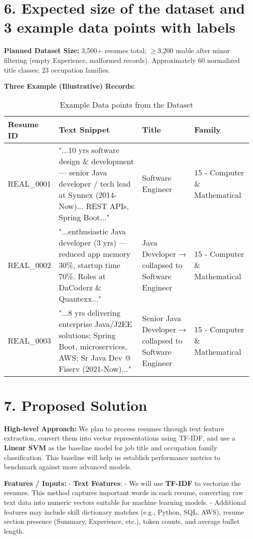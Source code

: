 \documentclass[12pt]{article}
\begin{document}
\section*{6. Expected size of the dataset and 3 example data points with labels}

\noindent \textbf{Planned Dataset Size:}  
3,500+ resumes total; $\geq$3,200 usable after minor filtering (empty Experience, malformed records). Approximately 60 normalized title classes; 23 occupation families.

\medskip
\noindent \textbf{Three Example (Illustrative) Records:}

\begin{table}[ht]
\centering
\begin{tabular}{|p{2.5cm}|p{5.5cm}|p{3.5cm}|p{3.5cm}|}
\hline
\textbf{Resume ID} & \textbf{Text Snippet} & \textbf{Title} & \textbf{Family} \\
\hline
REAL\_0001 & "...10 yrs software design \& development — senior Java developer / tech lead at Synnex (2014-Now)... REST APIs, Spring Boot..." & Software Engineer & 15 - Computer \& Mathematical \\
REAL\_0002 & "...enthusiastic Java developer (3 yrs) — reduced app memory 30\%, startup time 70\%. Roles at DaCoderz \& Quantexx..." & Java Developer → collapsed to Software Engineer & 15 - Computer \& Mathematical \\
REAL\_0003 & "...8 yrs delivering enterprise Java/J2EE solutions; Spring Boot, microservices, AWS; Sr Java Dev @ Fiserv (2021-Now)..." & Senior Java Developer → collapsed to Software Engineer & 15 - Computer \& Mathematical \\
\hline
\end{tabular}
\caption{Example Data points from the Dataset}
\label{tab:example-datapoints}
\end{table}


\section*{7. Proposed Solution}

\noindent \textbf{High-level Approach:}  
We plan to process resumes through text feature extraction, convert them into vector representations using TF-IDF, and use a \textbf{Linear SVM} as the baseline model for job title and occupation family classification. This baseline will help us establish performance metrics to benchmark against more advanced models.

\medskip
\noindent \textbf{Features / Inputs:}  
- \textbf{Text Features}:  
    - We will use \textbf{TF-IDF} to vectorize the resumes. This method captures important words in each resume, converting raw text data into numeric vectors suitable for machine learning models.
    - Additional features may include skill dictionary matches (e.g., Python, SQL, AWS), resume section presence (Summary, Experience, etc.), token counts, and average bullet length.
    
\end{document}
